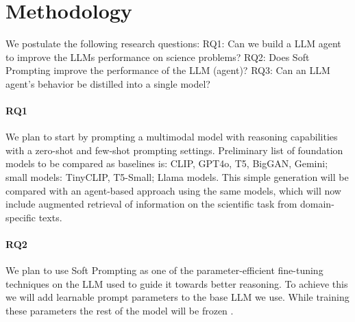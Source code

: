 \documentclass[10pt]{article}
\newcommand{\katja}[1]{\textbf{\textcolor{teal}{(Katja) #1}}}
\begin{document}

\section{Methodology}
We postulate the following research questions: 
RQ1: Can we build a LLM agent to improve the LLMs performance on science problems?
RQ2: Does Soft Prompting improve the performance of the LLM (agent)?
RQ3: Can an LLM agent's behavior be distilled into a single model?

\paragraph{RQ1} 
We plan to start by prompting a multimodal model with reasoning capabilities with a zero-shot and few-shot prompting settings. Preliminary list of foundation models to be compared as baselines is: CLIP, GPT4o, T5, BigGAN, Gemini; small models: TinyCLIP, T5-Small; Llama models. This simple generation will be compared with an agent-based approach using the same models, which will now include augmented retrieval of information on the scientific task from domain-specific texts. 

\paragraph{RQ2}
We plan to use Soft Prompting as one of the parameter-efficient fine-tuning techniques on the LLM used to guide it towards better reasoning. To achieve this we will add learnable prompt parameters to the base LLM we use. While training these parameters the rest of the model will be frozen \cite{lester2021prompt}.
\end{document}

